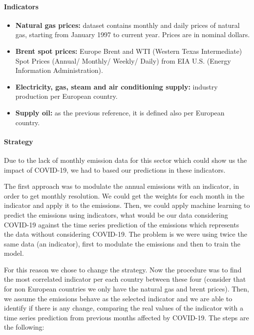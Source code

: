 \paragraph{Indicators}
\begin{itemize}
	\item \textbf{Natural gas prices:} \cite{gas} dataset contains monthly and daily prices of natural gas, starting from January 1997 to current year. Prices are in nominal dollars.
	\item \textbf{Brent spot prices:} \cite{brent} Europe Brent and WTI (Western Texas Intermediate) Spot Prices (Annual/ Monthly/ Weekly/ Daily) from EIA U.S. (Energy Information Administration).
	\item \textbf{Electricity, gas, steam and air conditioning supply:} \cite{production} industry production per European country.
	\item \textbf{Supply oil:} \cite{production} as the previous reference, it is defined also per European country.
\end{itemize}

\paragraph{Strategy}
Due to the lack of monthly emission data for this sector which could show us the impact of COVID-19, we had to based our predictions in these indicators.

The first approach was to modulate the annual emissions with an indicator, in order to get monthly resolution. We could get the weights for each month in the indicator and apply it to the emissions. Then, we could apply machine learning to predict the emissions using indicators, what would be our data considering COVID-19 against the time series prediction of the emissions which represents the data without considering COVID-19. The problem is we were using twice the same data (an indicator), first to modulate the emissions and then to train the model.

For this reason we chose to change the strategy. Now the procedure was to find the most correlated indicator per each country between these four (consider that for non European countries we only have the natural gas and brent prices). Then, we assume the emissions behave as the selected indicator and we are able to identify if there is any change, comparing the real values of the indicator with a time series prediction from previous months affected by COVID-19. The steps are the following:

